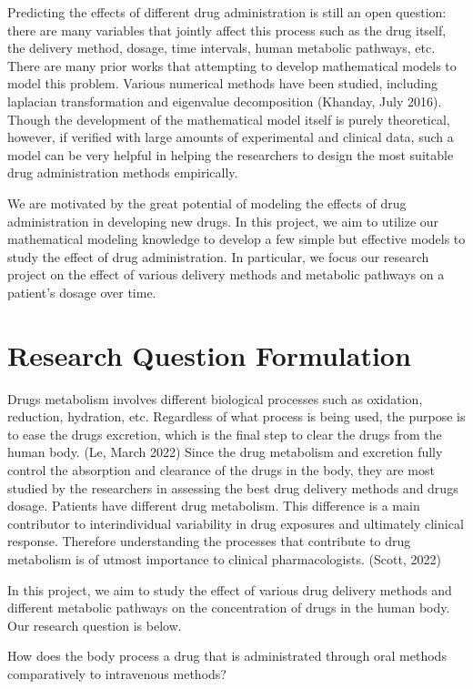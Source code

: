 \documentclass{article}
\begin{document}
Predicting the effects of different drug administration is still an open question: there are many variables that jointly affect this process such as the drug itself, the delivery method, dosage, time intervals, human metabolic pathways, etc. There are many prior works that attempting to develop mathematical models to model this problem. Various numerical methods have been studied, including laplacian transformation and eigenvalue decomposition (Khanday, July 2016). Though the development of the mathematical model itself is purely theoretical, however, if verified with large amounts of experimental and clinical data, such a model can be very helpful in helping the researchers to design the most suitable drug administration methods empirically.
 
We are motivated by the great potential of modeling the effects of drug administration in developing new drugs. In this project, we aim to utilize our mathematical modeling knowledge to develop a few simple but effective models to study the effect of drug administration. In particular, we focus our research project on the effect of various delivery methods and metabolic pathways on a patient’s dosage over time.


\section*{Research Question Formulation}

Drugs metabolism involves different biological processes such as oxidation, reduction, hydration, etc. Regardless of what process is being used, the purpose is to ease the drugs excretion, which is the final step to clear the drugs from the human body. (Le, March 2022) Since the drug metabolism and excretion fully control the absorption and clearance of the drugs in the body, they are most studied by the researchers in assessing the best drug delivery methods and drugs dosage. Patients have different drug metabolism. This difference is a main contributor to interindividual variability in drug exposures and ultimately clinical response. Therefore understanding the processes that contribute to drug metabolism is of utmost importance to clinical pharmacologists. (Scott, 2022)

In this project, we aim to study the effect of various drug delivery methods and different metabolic pathways on the concentration of drugs in the human body. Our research question is below.

How does the body process a drug that is administrated through oral methods comparatively to intravenous methods?
\end{document}
